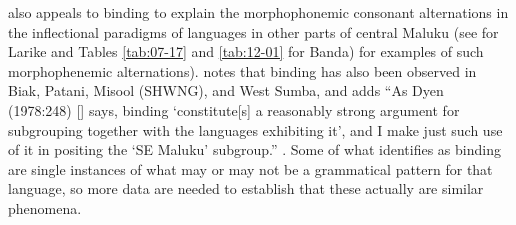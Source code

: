 
\citet[252]{Mills1991} also appeals to binding to explain the
morphophonemic consonant alternations in the inflectional paradigms
of languages in other parts of central Maluku (see 
for Larike and Tables \ref{tab:07-17} and \ref{tab:12-01} for Banda)
for examples of such morphophenemic alternations).
\citet[252f]{Mills1991} notes that binding has also been observed
in Biak, Patani, Misool (SHWNG), and West Sumba, and adds “As 
Dyen (1978:248) [\citealp{Dyen1978a}]
says, binding ‘constitute[s] a reasonably strong argument for subgrouping
together with the languages exhibiting it’,
and I make just such use of it in positing the ‘SE Maluku’ subgroup.” \citep[253]{Mills1991}.
Some of what \citeauthor{Mills1991} identifies as binding are single instances
of what may or may not be a grammatical pattern for that language,
so more data are needed to establish that these actually are similar phenomena.

